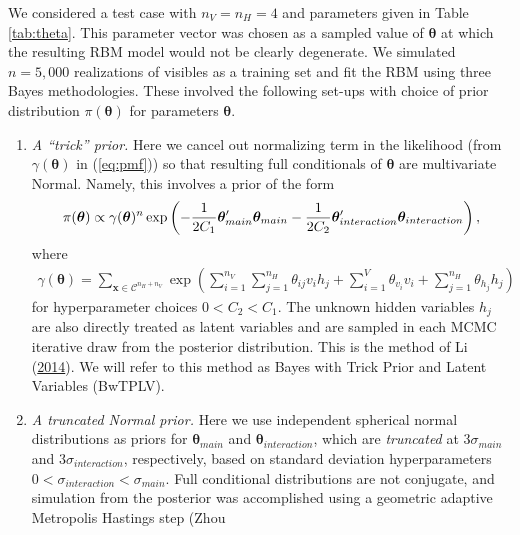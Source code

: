 \documentclass[12pt]{article}
\providecommand{\tightlist}{%
  \setlength{\itemsep}{0pt}\setlength{\parskip}{0pt}}
\theoremstyle{definition}
\newcommand{\nv}{{n_{\scriptscriptstyle V}}}
\newcommand{\nh}{{n_{\scriptscriptstyle H}}}
\begin{document}
We considered a test case with \(\nv = \nh = 4\) and parameters given in
Table \ref{tab:theta}. This parameter vector was chosen as a sampled
value of \(\boldsymbol \theta\) at which the resulting RBM model would
not be clearly degenerate. We simulated \(n = 5,000\) realizations of
visibles as a training set and fit the RBM using three Bayes
methodologies. These involved the following set-ups with choice of prior
distribution \(\pi(\boldsymbol \theta)\) for parameters
\(\boldsymbol \theta\).
\begin{enumerate}
\def\labelenumi{\arabic{enumi}.}
\tightlist
\item
  \emph{A ``trick'' prior.} Here we cancel out normalizing term in the
  likelihood (from \(\gamma(\boldsymbol \theta)\) in (\eqref{eq:pmf})) so
  that resulting full conditionals of \(\boldsymbol \theta\) are
  multivariate Normal. Namely, this involves a prior of the form
  \begin{align*}
  \pi(\boldsymbol \theta) \propto \gamma(\boldsymbol \theta)^n \exp\left(-\frac{1}{2C_{1}}\boldsymbol \theta_{main}'\boldsymbol \theta_{main} -\frac{1}{2C_{2}}\boldsymbol \theta_{interaction}'\boldsymbol \theta_{interaction}\right), \vspace{-.75cm}
  \end{align*}
  where
  \begin{align*}
  \gamma(\boldsymbol \theta) = \sum\limits_{\boldsymbol x \in \mathcal{C}^{\nh + \nv}}\exp\left(\sum\limits_{i = 1}^\nv\sum\limits_{j=1}^\nh \theta_{ij} v_i h_j + \sum\limits_{i = 1}^V\theta_{v_i} v_i + \sum\limits_{j = 1}^\nh\theta_{h_j} h_j\right) 
  \end{align*}
  for hyperparameter choices \(0< C_2 < C_1\). The unknown hidden
  variables \(h_j\) are also directly treated as latent variables and
  are sampled in each MCMC iterative draw from the posterior
  distribution. This is the method of Li
  (\protect\hyperlink{ref-li2014biclustering}{2014}). We will refer to
  this method as Bayes with Trick Prior and Latent Variables (BwTPLV).
\item
  \emph{A truncated Normal prior.} Here we use independent spherical
  normal distributions as priors for \(\boldsymbol \theta_{main}\) and
  \(\boldsymbol \theta_{interaction}\), which are \emph{truncated} at
  \(3\sigma_{main}\) and \(3\sigma_{interaction}\), respectively, based
  on standard deviation hyperparameters
  \(0<\sigma_{interaction}<\sigma_{main}\). Full conditional
  distributions are not conjugate, and simulation from the posterior was
  accomplished using a geometric adaptive Metropolis Hastings step (Zhou

\end{enumerate}
\end{document}
